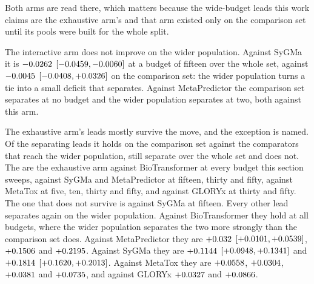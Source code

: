 \documentclass[journal=jcisd8,manuscript=suppinfo,layout=onecolumn]{achemso}
\begin{document}
Both arms are read there, which matters
because the wide-budget
leads this work claims are the exhaustive arm's and that arm existed only on the comparison set
until its pools were built for the whole split.

The interactive arm does not improve on the wider population. Against SyGMa it is
$-0.0262$ $[-0.0459,
-0.0060]$ at a budget of fifteen over the whole set, against
$-0.0045$ $[-0.0408, +0.0326]$ on
the comparison set: the wider population turns a tie into a small deficit that separates. Against
MetaPredictor the comparison set separates at no budget and the wider population separates at two,
both against this arm.

The exhaustive arm's leads mostly survive the move, and the exception is named. Of the
\numPopdefLeadstotalWord{} separating leads it holds on the comparison set against the
\numPopdefWholearmsWord{} comparators that reach the wider population,
\numPopdefLeadskeptWord{} still separate over the whole set and
\numPopdefLeadslostWord{} does not. The \numPopdefLeadstotalWord{} are the exhaustive arm against
BioTransformer at every budget this section sweeps, against SyGMa and MetaPredictor at fifteen,
thirty and fifty, against MetaTox at five, ten, thirty and fifty, and against GLORYx at thirty and
fifty. The one that does not survive is against SyGMa at fifteen. Every other lead separates again
on the wider population. Against BioTransformer they hold at all \numPopdefMetatoxbudgetsWord{}
budgets, where the wider population separates the two more strongly than the comparison set does.
Against MetaPredictor they are $+0.032$
$[+0.0101, +0.0539]$,
$+0.1506$ and $+0.2195$.
Against SyGMa they are $+0.1144$ $[+0.0948,
+0.1341]$ and $+0.1814$
$[+0.1620, +0.2013]$. Against MetaTox they
are $+0.0558$, $+0.0304$,
$+0.0381$ and $+0.0735$, and against GLORYx
$+0.0327$ and $+0.0866$.
\end{document}
